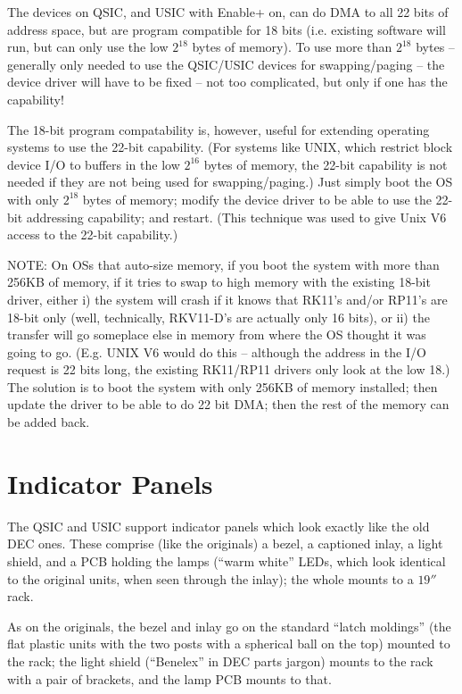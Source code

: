 The devices on QSIC, and USIC with Enable+ on, can do DMA to all 22 bits of
address space, but are program compatible for 18 bits (i.e. existing software
will run, but can only use the low $2^{18}$ bytes of memory). To use more
than $2^{18}$ bytes -- generally only needed to use the QSIC/USIC devices for
swapping/paging -- the device driver will have to be fixed -- not too
complicated, but only if one has the capability!

The 18-bit program compatability is, however, useful for extending operating
systems to use the 22-bit capability. (For systems like UNIX, which restrict
block device I/O to buffers in the low $2^{16}$ bytes of memory, the
22-bit capability is not needed if they are not being used for swapping/paging.)
Just simply boot the OS with only $2^{18}$ bytes of memory; modify the device
driver to be able to use the 22-bit addressing capability; and restart. (This
technique was used to give Unix V6 access to the 22-bit capability.)

NOTE: On OSs that auto-size memory, if you boot the system with more than
256KB of memory, if it tries to swap to high memory with the existing 18-bit
driver, either i) the system will crash if it knows that RK11's and/or RP11's
are 18-bit only (well, technically, RKV11-D's are actually only 16 bits), or
ii) the transfer will go someplace else in memory from where the OS thought
it was going to go. (E.g. UNIX V6 would do this -- although the address in the
I/O request is 22 bits long, the existing RK11/RP11 drivers only look at the
low 18.) The solution is to boot the system with only 256KB of memory
installed; then update the driver to be able to do 22 bit DMA; then the rest
of the memory can be added back.


\chapter{Indicator Panels}

The QSIC and USIC support indicator panels which look exactly like the old
DEC ones. These comprise (like the originals) a bezel, a captioned inlay, a
light shield, and a PCB holding the lamps (``warm white'' LEDs, which look
identical to the original units, when seen through the inlay); the whole
mounts to a $19''$ rack.

As on the originals, the bezel and inlay go on the standard ``latch moldings''
(the flat plastic units with the two posts with a spherical ball on the top)
mounted to the rack; the light shield (``Benelex'' in DEC parts jargon) mounts
to the rack with a pair of brackets, and the lamp PCB mounts to that.

